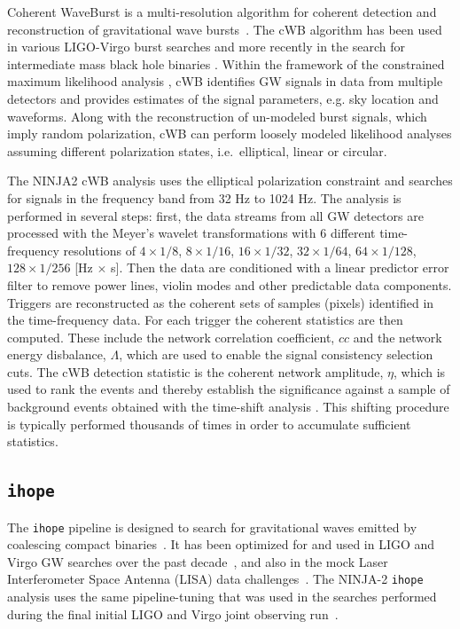 \documentclass[12pt]{iopart}
\newcommand{\ihope}{\texttt{ihope}}
\begin{document}
Coherent WaveBurst is a multi-resolution algorithm for coherent
detection and reconstruction of gravitational wave
bursts~\cite{Klimenko:2008fu}. The cWB algorithm has been used in
various LIGO-Virgo burst searches
\cite{Abbott:2007wu,Abadie:2010mt,Abadie:2012rq} and more recently in
the search for intermediate mass black hole binaries
\cite{Virgo:2012aa}.  Within the framework of the constrained maximum
likelihood analysis \cite{Klimenko:2008fu}, cWB identifies GW signals
in data from multiple detectors and provides estimates of the signal
parameters, e.g. sky location and waveforms.  Along with the
reconstruction of un-modeled burst signals, which imply random
polarization, cWB can perform loosely modeled likelihood analyses
assuming different polarization states, i.e.\ elliptical, linear or
circular.

The NINJA2 cWB analysis uses the elliptical polarization constraint 
\cite{Pankow:2009nx,Virgo:2012aa} and searches for signals in the frequency 
band from 32 Hz to 1024 Hz. The analysis is performed in several steps: first, 
the data streams from all GW detectors are processed with the Meyer's wavelet 
transformations with 6 different  time-frequency resolutions of 
$ 4\times1/8$, $8\times1/16$, $16\times1/32$, $32\times1/64$, 
$64\times1/128$, $128\times1/256$ [Hz $\times$ s]. Then the data are 
conditioned 
with a linear predictor error filter to remove power lines, violin modes 
and other predictable data components. Triggers are reconstructed as the 
coherent
sets of samples (pixels) identified in the time-frequency data. For each 
trigger the coherent 
statistics are then computed. These include the network correlation 
coefficient, ${cc}$ and the network energy disbalance, ${\Lambda}$, which are 
used to enable the signal consistency selection cuts. The cWB detection 
statistic is the coherent network amplitude, $\eta$, which is used to rank the 
events and thereby establish the significance against a sample of 
background events obtained with the time-shift analysis 
\cite{Klimenko:2008fu,Virgo:2012aa,Pankow:2009nx}. 
This shifting procedure is typically performed 
thousands of times in order to accumulate sufficient statistics.

\subsection{\ihope{}}
\label{ssec:ihope_pipelines}

The \ihope{} pipeline is designed to search for gravitational waves
emitted by coalescing compact binaries~\cite{Babak:2012zx}. It has been
optimized for and used in LIGO and Virgo GW searches over the past 
decade~\cite{Abbott:2007xi, Abbott:2009tt, Abbott:2009qj, Abadie:2010yb, 
Colaboration:2011np, Aasi:2012rja}, and also in the mock Laser 
Interferometer Space Antenna (LISA) data 
challenges~\cite{Babak:2008aa}. The NINJA-2 \ihope{} analysis uses the same 
pipeline-tuning that was used in the searches performed during 
the final initial LIGO and Virgo joint observing 
run~\cite{Colaboration:2011np}.
\end{document}
